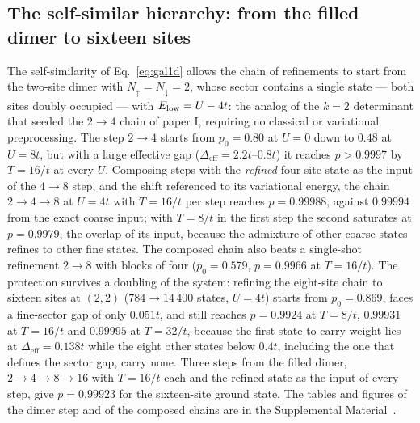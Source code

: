 \documentclass[a4paper,11pt,noarxiv]{quantumarticle}
\newcommand{\Deff}{\Delta_{\mathrm{eff}}}
\newcommand{\SM}{Supplemental Material~\cite{SM}}
\begin{document}
\subsection{The self-similar hierarchy: from the filled dimer to sixteen sites}
\label{sec:dimer}
The self-similarity of Eq.~\eqref{eq:gal1d} allows the chain of refinements
to start from the two-site dimer with $N_\uparrow=N_\downarrow=2$, whose
sector contains a single state --- both sites doubly occupied --- with
$E_{\rm low}=U-4t$: the analog of the $k=2$ determinant that seeded the
$2\to4$ chain of paper I, requiring no classical or variational
preprocessing.  The step $2\to4$ starts from $p_0=0.80$ at $U=0$ down to
$0.48$ at $U=8t$, but with a large effective gap ($\Deff=2.2t$--$0.8t$) it
reaches $p>0.9997$ by $T=16/t$ at every $U$.  Composing steps with the
\emph{refined} four-site state as the input of the $4\to8$ step, and the
shift referenced to its variational energy, the chain $2\to4\to8$ at $U=4t$
with $T=16/t$ per step reaches $p=0.99988$, against $0.99994$ from the exact
coarse input; with $T=8/t$ in the first step the second saturates at
$p=0.9979$, the overlap of its input, because the admixture of other coarse
states refines to other fine states.  The composed chain also beats a
single-shot refinement $2\to8$ with blocks of four ($p_0=0.579$, $p=0.9966$
at $T=16/t$).  The protection survives a doubling of the system: refining
the eight-site chain to sixteen sites at $(2,2)$ ($784\to14\,400$ states,
$U=4t$) starts from $p_0=0.869$, faces a fine-sector gap of only $0.051t$,
and still reaches $p=0.9924$ at $T=8/t$, $0.99931$ at $T=16/t$ and
$0.99995$ at $T=32/t$, because the first state to carry weight lies at
$\Deff=0.138t$ while the eight other states below $0.4t$, including the one
that defines the sector gap, carry none.  Three steps from the filled dimer,
$2\to4\to8\to16$ with $T=16/t$ each and the refined state as the input of
every step, give $p=0.99923$ for the sixteen-site ground state.  The tables
and figures of the dimer step and of the composed chains are in the \SM.
\end{document}
